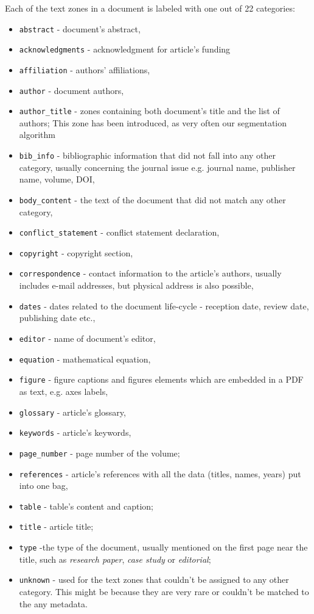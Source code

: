 Each of the text zones in a document is labeled with one out of 22 categories:
\begin{itemize}
    \item \verb+abstract+ - document's abstract,
    \item \verb+acknowledgments+ - acknowledgment for article's funding
    \item \verb+affiliation+ - authors' affiliations,
    \item \verb+author+ - document authors,
    \item \verb+author_title+ - zones containing both document's title and the list of authors; This zone has been introduced, as very often our segmentation algorithm 
    \item \verb+bib_info+ - bibliographic information that did not fall into any other category, usually concerning the journal issue e.g. journal name, publisher name, volume, DOI,
    \item \verb+body_content+ - the text of the document that did not match any other category,
    \item \verb+conflict_statement+ - conflict statement declaration,
    \item \verb+copyright+ - copyright section,
    \item \verb+correspondence+ - contact information to the article's authors, usually includes e-mail addresses, but physical address is also possible,
    \item \verb+dates+ - dates related to the document life-cycle - reception date, review date, publishing date etc.,
    \item \verb+editor+ - name of document's editor,
    \item \verb+equation+ - mathematical equation,
    \item \verb+figure+ - figure captions and figures elements which are embedded in a PDF as text, e.g. axes labels,
    \item \verb+glossary+ - article's glossary,
    \item \verb+keywords+ - article's keywords,
    \item \verb+page_number+ - page number of the volume;
    \item \verb+references+ - article's references with all the data (titles, names, years) put into one bag,
    \item \verb+table+ - table's content and caption;
    \item \verb+title+ - article title;
    \item \verb+type+ -the type of the document, usually mentioned on the first page near the title, such as \textit{research paper}, \textit{case study} or \textit{editorial};
    \item \verb+unknown+ - used for the text zones that couldn't be assigned to any other category. This might be because they are very rare or couldn't be matched to the any metadata.
\end{itemize}
